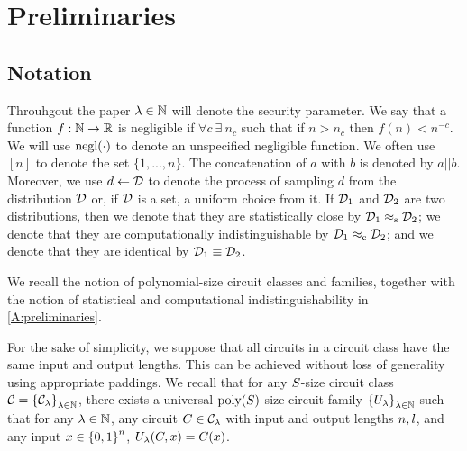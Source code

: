\section{Preliminaries}
\label{sec:preliminaries}



\subsection{Notation}
Throuhgout the paper $\lambda \in \mathbb{N}$ will denote the security parameter. We say that a function $f : \mathbb{N} \rightarrow \mathbb{R}$ is negligible if $\forall c~ \exists~  n_c$ such that if $n>n_c$ then $f(n)< n^{-c}$. We will use $\operatorname{negl}(\cdot)$ to denote an unspecified negligible function. We often use $[n]$ to denote the set $\{1,...,n\}$. The concatenation of $a$ with $b$ is denoted by $a||b$. Moreover, we use $d \leftarrow {\cal D}$ to denote the process
of sampling $d$ from the distribution ${\cal D}$ or, if ${\cal D}$ is a set, a uniform choice from it.  If ${\cal D}_1$ and ${\cal D}_2$ are two distributions, then we denote that they are statistically
close by ${\cal D}_1 \approx_{\mathrm{s}} {\cal D}_2$; we denote that they are computationally indistinguishable
by ${\cal D}_1 \approx_{\mathrm{c}}  {\cal D}_2$; and we denote that they are identical by $ {\cal D}_1 \equiv {\cal D}_2$.


We recall the notion of polynomial-size circuit classes and families, together with the notion of statistical and computational indistinguishability in \cref{A:preliminaries}.

For the sake of simplicity, we suppose that all circuits in a circuit
class have the same input and output lengths. This can be achieved
without loss of generality using appropriate paddings.  We recall that
for any $S$-size circuit class $\mathcal{C} =
{\{\mathcal{C}_\lambda\}}_{\lambda \in \mathbb{N}}$, there exists a universal
$\text{poly}(S)$-size circuit family
${\{U_\lambda\}}_{\lambda \in \mathbb{N}}$ such that for any $\lambda
\in \mathbb{N}$, any circuit $C \in \mathcal{C}_\lambda$ with input and
output lengths $n, l$, and any input $x \in
{\{0,1\}}^n$, $U_\lambda(C, x) =
C(x)$.


